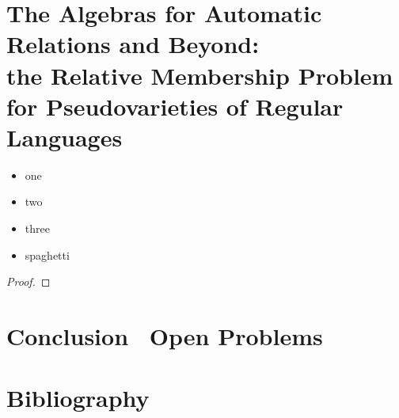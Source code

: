 \documentclass[a4paper,sfsidenotes,twoside,justified,nobib]{tufte-book-custom}
\begin{document}



\chapter[Relative Membership for Pseudovarieties of Regular Languages]{The Algebras for Automatic Relations and Beyond: \\the Relative Membership Problem for Pseudovarieties of Regular Languages}

\lipsum[1]
\begin{itemize}
	\item one
	\item two
	\item three
	\item spaghetti
\end{itemize}
\lipsum[1]

\begin{theorem}
	\lipsum[1]
\end{theorem}

\lipsum[1]

\begin{proof}
	\lipsum[1]
\end{proof}

\lipsum[1]

\lipsum[2]

\chapter{Conclusion \fancyand~Open Problems}

\backmatter
\chapter*{Bibliography}
\printbibliography[heading=none]
\end{document}
